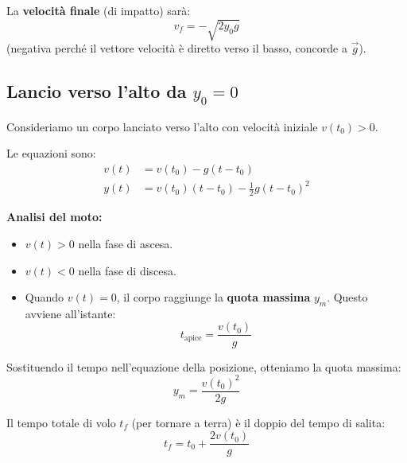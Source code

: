 La \textbf{velocità finale} (di impatto) sarà:
\begin{equation}
    v_f = - \sqrt{2y_0 g}
\end{equation}
(negativa perché il vettore velocità è diretto verso il basso, concorde a $\vec{g}$).

\begin{center}
\end{center}

\subsection{Lancio verso l'alto da \texorpdfstring{$y_0 = 0$}{y\_0 = 0}}
Consideriamo un corpo lanciato verso l'alto con velocità iniziale $v(t_0) > 0$.

Le equazioni sono:
\begin{align*}
    v(t) &= v(t_0) - g(t - t_0) \\
    y(t) &= v(t_0)(t - t_0) - \frac{1}{2}g(t - t_0)^2
\end{align*}

\textbf{Analisi del moto:}
\begin{itemize}
    \item $v(t) > 0$ nella fase di ascesa.
    \item $v(t) < 0$ nella fase di discesa.
    \item Quando $v(t) = 0$, il corpo raggiunge la \textbf{quota massima} $y_m$. Questo avviene all'istante:
    \begin{equation}
    t_{\text{apice}} = \frac{v(t_0)}{g}
\end{equation}
\end{itemize}
Sostituendo il tempo nell'equazione della posizione, otteniamo la quota massima:
\begin{equation}
    y_m = \frac{v(t_0)^2}{2g}
\end{equation}

Il tempo totale di volo $t_f$ (per tornare a terra) è il doppio del tempo di salita:
\begin{equation}
    t_f = t_0 + \frac{2v(t_0)}{g}
\end{equation}

